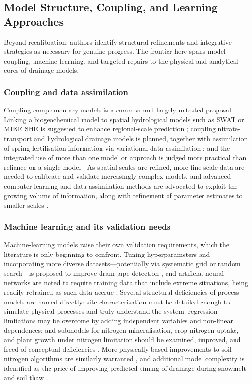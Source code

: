 \subsection{Model Structure, Coupling, and Learning Approaches}

Beyond recalibration, authors identify structural refinements and integrative strategies as necessary for genuine progress. The frontier here spans model coupling, machine learning, and targeted repairs to the physical and analytical cores of drainage models.

\subsubsection{Coupling and data assimilation}

Coupling complementary models is a common and largely untested proposal. Linking a biogeochemical model to spatial hydrological models such as SWAT or MIKE SHE is suggested to enhance regional-scale prediction \parencite{Li2006}; coupling nitrate-transport and hydrological drainage models is planned, together with assimilation of spring-fertilisation information via variational data assimilation \parencite{Chelil2022}; and the integrated use of more than one model or approach is judged more practical than reliance on a single model \parencite{Singh2019b}. As spatial scales are refined, more fine-scale data are needed to calibrate and validate increasingly complex models, and advanced computer-learning and data-assimilation methods are advocated to exploit the growing volume of information, along with refinement of parameter estimates to smaller scales \parencite{Apostel2021}.

\subsubsection{Machine learning and its validation needs}

Machine-learning models raise their own validation requirements, which the literature is only beginning to confront. Tuning hyperparameters and incorporating more diverse datasets---potentially via systematic grid or random search---is proposed to improve drain-pipe detection \parencite{Song2021}, and artificial neural networks are noted to require training data that include extreme situations, being readily retrained as such data accrue \parencite{Yang2000}. Several structural deficiencies of process models are named directly: site characterisation must be detailed enough to simulate physical processes and truly understand the system; regression limitations may be overcome by adding independent variables and non-linear dependences; and submodels for nitrogen mineralisation, crop nitrogen uptake, and plant growth under nitrogen limitation should be examined, improved, and freed of conceptual deficiencies \parencite{Ahuja2007}. More physically based improvements to soil-nitrogen algorithms are similarly warranted \parencite{Ikenberry2017}, and additional model complexity is identified as the price of improving predicted timing of drainage during snowmelt and soil thaw \parencite{Feyereisen2007}.

